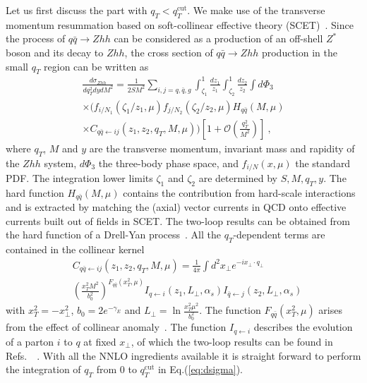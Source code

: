 \documentclass[a4paper,amsmath,preprintnumbers,showpacs,twocolumn,prl,superscriptaddress, nofootinbib]{revtex4}
\newcommand{\nn}{\nonumber}
\newcommand{\cut}{\textrm{cut}}
\begin{document}
Let us first discuss the part with  $q_T<q_T^{\cut}$.
We make use of the transverse momentum resummation
based on  soft-collinear effective theory (SCET)~\cite{Bauer:2000yr,Bauer:2001yt,Beneke:2002ph}.
Since the process of $q\bar{q}\to Zhh$ can be considered as a production of an off-shell $Z^*$ boson and its decay to $Zhh$,
the cross section of $q\bar{q}\to Zhh$ production in the small $q_T$ region
can be written as~\cite{Becher:2010tm}
\begin{multline}
  \frac{d\sigma_{Zhh}}{dq_T^2 dydM^2} =\frac{1}{2 SM^2} \sum_{i,j=q,\bar{q},g}\int_{\zeta_1}^1 \frac{dz_1}{z_1}
      \int_{\zeta_2}^1 \frac{dz_2}{z_2}\int d\Phi_3
     \\
      \times
     \bigg( f_{i/N_1}(\zeta_1/z_1,\mu)f_{j/N_2}(\zeta_2/z_2,\mu) H_{q\bar{q}}(M,\mu)
      \\ 
      \times  C_{q\bar{q}\leftarrow i j}(z_1,z_2,q_T, M,\mu)\bigg) \left[1
+\mathcal{O}\left(\frac{q_T^2}{M^2}\right) \right]~,
\label{eq:dsigma}
\end{multline}
where $q_T$, $M$ and $y$ are the transverse momentum, invariant mass and rapidity of the $Zhh$ system,
$ d\Phi_3$ the three-body phase space,
and $ f_{i/N}(x,\mu)$  the standard PDF.
The integration lower limits $\zeta_1$ and $\zeta_2$ are determined by $S,M,q_T, y$.
The hard function $H_{q\bar{q}}(M,\mu) $ contains the contribution from hard-scale interactions and
is extracted by matching the (axial) vector currents in QCD onto effective currents built out of fields in SCET.
The two-loop results can be obtained from the hard function of a Drell-Yan process~\cite{Becher:2006mr}.
All the $q_T$-dependent terms are contained in the collinear kernel~\cite{Becher:2010tm}
\begin{align} \label{eq:c_scet}
    & C_{q\bar{q}\leftarrow i j}(z_1,z_2,q_T, M,\mu)
     = \frac{1}{4\pi}\int d^2x_\perp e^{- i x_\perp \cdot q_\perp}  \\
    &  \left(\frac{x_T^2 M^2}{b_0^2}\right)^{F_{q\bar{q}}(x_T^2, \mu)}
     I_{q\leftarrow i}(z_1,L_\perp, \alpha_s) I_{\bar{q}\leftarrow j}(z_2,L_\perp, \alpha_s)\nn
\end{align}
with  $x_T^2=-x_{\perp}^2$, $  b_0 = 2 e^{-\gamma_E}$ and $  L_\perp = \ln\frac{x_T^2\mu^2}{b_0^2}$.
The  function $F_{q\bar{q}}(x_T^2, \mu)$ arises from the effect of collinear anomaly~\citep{Becher:2010tm}.
The function $I_{q\leftarrow i}$ describes the evolution of a parton $i$ to $q$ at fixed $x_{\perp}$,
of which the two-loop results  can be found in Refs.~\cite{Gehrmann:2012ze,Gehrmann:2014yya}~.
With all the NNLO ingredients available  it is straight forward to perform the integration of $q_T$ from $0$ to $q_T^{\cut}$ in Eq.(\ref{eq:dsigma}).
\end{document}
